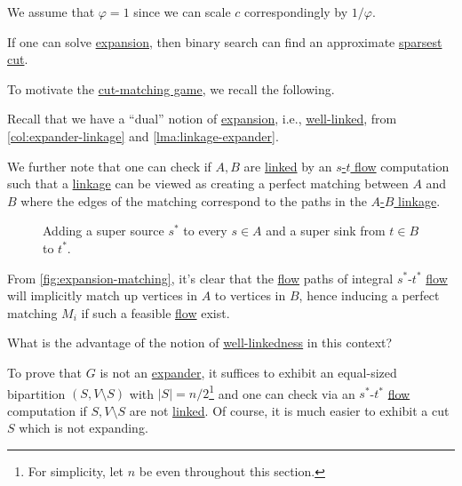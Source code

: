 \begin{note}
	We assume that \(\varphi = 1\) since we can scale \(c\) correspondingly by \(1 / \varphi \).
\end{note}

\begin{remark}
	If one can solve \hyperref[prb:expansion]{expansion}, then binary search can find an approximate \hyperref[prb:sparsest-cut]{sparsest cut}.
\end{remark}

To motivate the \hyperref[def:cut-matching-game]{cut-matching game}, we recall the following.

\begin{prev}
	Recall that we have a ``dual'' notion of \hyperref[def:expansion]{expansion}, i.e., \hyperref[def:well-linked]{well-linked}, from \autoref{col:expander-linkage} and \autoref{lma:linkage-expander}.
\end{prev}

We further note that one can check if \(A, B\) are \hyperref[def:linkage]{linked} by an \hyperref[prb:s-t-max-flow]{\(s\)-\(t\) flow} computation such that a \hyperref[def:linkage]{linkage} can be viewed as creating a perfect matching between \(A\) and \(B\) where the edges of the matching correspond to the paths in the \hyperref[def:linkage]{\(A\)-\(B\) linkage}.

\begin{center}
	\begin{figure}[H]
		\centering
		\caption{Adding a super source \(s^{\ast} \) to every \(s \in A\) and a super sink from \(t \in B\) to \(t^{\ast} \).}
		\label{fig:expansion-matching}
	\end{figure}
\end{center}

From \autoref{fig:expansion-matching}, it's clear that the \hyperref[def:flow]{flow} paths of integral \(s^{\ast} \)-\(t^{\ast} \) \hyperref[def:flow]{flow} will implicitly match up vertices in \(A\) to vertices in \(B\), hence inducing a perfect matching \(M_i\) if such a feasible \hyperref[def:flow]{flow} exist.

\begin{problem*}
	What is the advantage of the notion of \hyperref[def:well-linked]{well-linkedness} in this context?
\end{problem*}
\begin{answer}
	To prove that \(G\) is not an \hyperref[def:expander]{expander}, it suffices to exhibit an equal-sized bipartition \((S, V\setminus S)\) with \(\lvert S \rvert = n / 2\)\footnote{For simplicity, let \(n\) be even throughout this section.} and one can check via an \(s^{\ast} \)-\(t^{\ast} \) \hyperref[def:flow]{flow} computation if \(S, V\setminus S\) are not \hyperref[def:linkage]{linked}. Of course, it is much easier to exhibit a cut \(S\) which is not expanding.
\end{answer}

